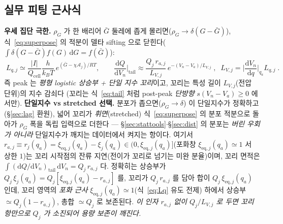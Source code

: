 \documentclass[11pt,a4paper]{article}
\newcommand{\dd}{\mathrm{d}}
\newcommand{\eq}{\mathrm{eq}}
\newcommand{\cell}{\mathrm{cell}}
\begin{document}
\subsection{실무 피팅 근사식}
\textbf{우세 집단 극한.} $\rho_G$ 가 한 배리어 $\bar G$ 둘레에 좁게 몰리면($\rho_G\to\delta(G-\bar G)$),
식~\eqref{eq:superpose} 의 적분이 델타 sifting 으로 닫힌다($\int\delta(G-\bar G)f(G)\,\dd G=f(\bar G)$):
\begin{equation}
\boxed{\;L_{q,j}\simeq\frac{|I|}{Q_\cell}\frac{h}{k_BT}\,e^{(\bar G-\chi\mathcal A_j)/RT},\qquad
\frac{\dd Q}{\dd V_n}\Big|_{\text{tail}}\approx\frac{Q_j\,r_{a,j}}{L_{V,j}}\,e^{-(V_n-V_a)/L_{V,j}}\;,\;\;
L_{V,j}=\Big|\frac{\dd V_n}{\dd q}\Big|_{q_a}L_{q,j}\;.}
\label{eq:simplefit}
\end{equation}
즉 peak 는 \emph{평형 logistic 상승부 + 단일 지수 꼬리}이고, 꼬리는 특성 길이 $L_{V,j}$(전압 단위)의 지수 감쇠다
(꼬리는 식~\eqref{eq:tail} 처럼 post-peak \emph{단방향} $s(V_n-V_a)\ge0$ 에서만).
\textbf{단일지수 vs stretched 선택.} 분포가 좁으면($\rho_G\to\delta$) 이 단일지수가 정확하고(\S\ref{sec:lag} 환원),
넓어 꼬리가 \emph{휘면}(stretched) 식~\eqref{eq:superpose} 의 분포 적분으로 돌아가 $\rho_G$ 폭을 독립 입력으로
더한다 — \S\ref{sec:stattools}$\cdot$\S\ref{sec:dist} 의 분포는 \emph{버린 우회가 아니라} 단일지수가 깨지는
데이터에서 켜지는 항이다.
여기서 $r_{a,j}\equiv r_j(q_a)=\xi_{\eq,j}(q_a)-\xi_j(q_a)\in(0,\xi_{\eq,j}(q_a)]$(포화창 $\xi_{\eq,j}(q_a)\simeq1$ 서
상한 $1$)는 꼬리 시작점의 잔류 지연(전이가 꼬리로 넘기는
미완 분율)이며, 꼬리 면적은 $\int(\dd Q/\dd V_n)_{\text{tail}}\,\dd V_n=Q_j\,r_{a,j}$ 다. 정확히는 상승부가
$Q_j\,\xi_j(q_a)=Q_j[\xi_{\eq,j}(q_a)-r_{a,j}]$ 를, 꼬리가 $Q_j\,r_{a,j}$ 를 담아 합이 $Q_j\,\xi_{\eq,j}(q_a)$ 인데,
꼬리 영역의 \emph{포화 근사} $\xi_{\eq,j}(q_a)\simeq1$(식~\eqref{eq:Lq} 유도 전제) 하에서 상승부 $\simeq Q_j(1-r_{a,j})$,
총합 $\simeq Q_j$ 로 보존된다. \emph{이 인자 $r_{a,j}$ 없이 $Q_j/L_{V,j}$ 로 두면 꼬리 항만으로 $Q_j$ 가 소진되어 용량 보존이 깨진다.}
\end{document}
